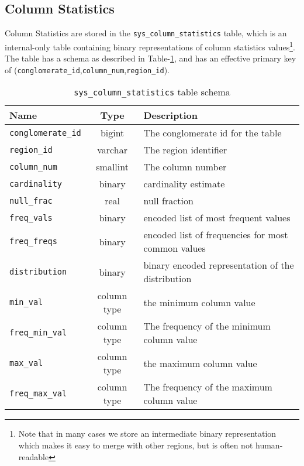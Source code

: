 \subsection{Column Statistics}
Column Statistics are stored in the \texttt{sys\_column\_statistics} table, which is an internal-only table containing binary representations of column statistics values\footnote{Note that in many cases we store an intermediate binary representation which makes it easy to merge with other regions, but is often not human-readable}. The table has a schema as described in Table-\ref{table:columnStatistics}, and has an effective primary key of 
\linebreak(\texttt{conglomerate\_id},\texttt{column\_num},\texttt{region\_id}).

\begin{table}
				\begin{tabular}{|l|c|p{6cm}|}
								\hline
								\bf{Name}									& \bf{Type}	&	\bf{Description} \\ \hline	
								\texttt{conglomerate\_id}	&	bigint		&	The conglomerate id for the table \\ \hline
								\texttt{region\_id}				&	varchar		&	The region identifier \\ \hline
								\texttt{column\_num}			&	smallint	& The column number \\ \hline
								\texttt{cardinality}			&	binary		&	cardinality estimate \\ \hline
								\texttt{null\_frac}				&	real			&	null fraction \\ \hline
								\texttt{freq\_vals}				&	binary		&	encoded list of most frequent values \\ \hline
								\texttt{freq\_freqs}			&	binary		&	encoded list of frequencies for most common values \\ \hline
								\texttt{distribution}			&	binary		&	binary encoded representation of the distribution \\ \hline
								\texttt{min\_val}					&	column type	&	the minimum column value	\\	\hline
								\texttt{freq\_min\_val}		&	column type	&	The frequency of the minimum column value \\ \hline
								\texttt{max\_val}					&	column type	&	the maximum column value	\\	\hline
								\texttt{freq\_max\_val}		&	column type	&	The frequency of the maximum column value \\ \hline
				\end{tabular}
				\caption{\texttt{sys\_column\_statistics} table schema}
				\label{table:columnStatistics}
\end{table}

